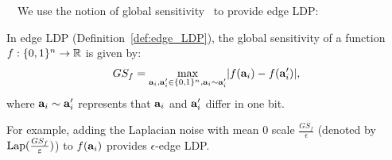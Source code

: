 


\smallskip
{}~~We use the notion of global sensitivity~\cite{DP} to provide edge LDP: 
\begin{definition}
In edge LDP (Definition~\ref{def:edge_LDP}), the global sensitivity of a function $f: \{0,1\}^n \rightarrow \mathbb{R}$ is given by:
\begin{align*}
    GS_f = \underset{\mathbf{a}_i, \mathbf{a}'_i \in \{0,1\}^n, \mathbf{a}_i \sim \mathbf{a}'_i}{\max} |f(\mathbf{a}_i) - f(\mathbf{a}'_i)|,
\end{align*}
where $\mathbf{a}_i \sim \mathbf{a}'_i$ represents that $\mathbf{a}_i$ and $\mathbf{a}'_i$ differ in one bit.
\end{definition}
For example, adding the Laplacian noise with mean $0$ scale $\frac{GS_f}{\epsilon}$ (denoted by $\textrm{Lap}(\frac{GS_f}{\varepsilon})$) to 
$f(\mathbf{a}_i)$ 
provides $\epsilon$-edge LDP. 

